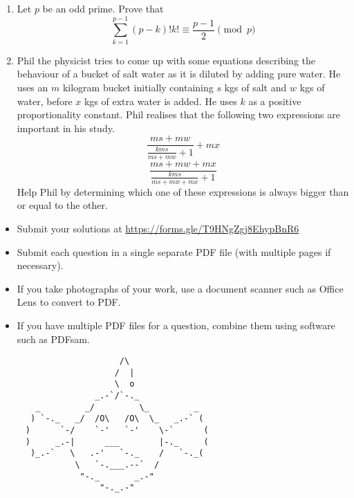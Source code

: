 \documentclass{article}
\begin{document}
\begin{enumerate}[itemsep=\fill]
\item %
Let $p$ be an odd prime. Prove that
\[
	\sum_{k=1}^{p-1} (p-k)!k! \equiv \frac{p-1}{2} \pmod{p}
\]


\item %
Phil the physicist tries to come up with some equations describing the behaviour of a bucket of salt water as it is diluted by adding pure water. He uses an $m$ kilogram bucket initially containing $s$ kgs of salt and $w$ kgs of water, before $x$ kgs of extra water is added. He uses $k$ as a positive proportionality constant. Phil realises that the following two expressions are important in his study. 
$$\frac{ms+mw}{\frac{kms}{ms+mw}+1} + mx$$
$$\frac{ms+mw+mx}{\frac{kms}{ms+mw+mx}+1}$$
Help Phil by determining which one of these expressions is always bigger than or equal to the other.
\end{enumerate}


\vfill
\begin{itemize}
	\item Submit your solutions at \href{https://forms.gle/T9HNgZgj8EhypBnR6}{https://forms.gle/T9HNgZgj8EhypBnR6}
	\item Submit each question in a single separate PDF file (with multiple pages if necessary).
	\item If you take photographs of your work, use a document scanner such as Office Lens to convert to PDF.
	\item If you have multiple PDF files for a question, combine them using software such as PDFsam.
\end{itemize}

\vfill
\centering
\small
\begin{BVerbatim}
                        /\
                       /  |
                       \  o
                   _.-`/`-._
       _         _/         \_         _
      ) `-._   _/  /O\   /O\  \_   _.-` (
     )      `-/    `-'   `-'    \-`      (
     )     _.-|      ___        |-._     (
      )_.-`   \   .-'   `-._    /   `-._(
               \   `-.___.--`  /
                "-._       _.-"
                    "-._.-"
\end{BVerbatim}
\end{document}
